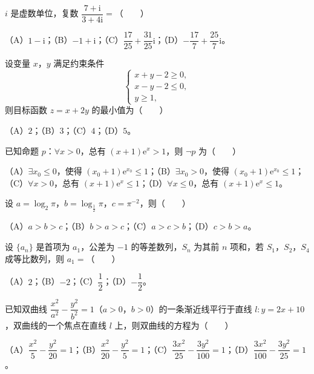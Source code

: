 \begin{question}
$i$ 是虚数单位，复数 $\dfrac{7+\mathrm i}{3+4\mathrm i}=$\mbox{（　　）}

（A）$1-\mathrm i$；（B）$-1+\mathrm i$；（C）$\dfrac{17}{25}+\dfrac{31}{25}\mathrm i$；（D）$-\dfrac{17}{7}+\dfrac{25}{7}\mathrm i$。

\end{question}
\begin{question}
设变量 $x$，$y$ 满足约束条件
\nopagebreak[4]
\[\begin{cases}
x+y-2\geqslant 0,\\
x-y-2\leqslant 0,\\
y\geqslant 1,
\end{cases}\]
则目标函数 $z=x+2y$ 的最小值为\mbox{（　　）}

（A）$2$；（B）$3$；（C）$4$；（D）$5$。

\end{question}
\begin{question}
已知命题 $p$：$\forall x>0$，总有 $(x+1)\mathrm e^x>1$，则 $\neg p$ 为\mbox{（　　）}

（A）$\exists x_0\leqslant 0$，使得 $(x_0+1)\mathrm e^{x_0}\leqslant 1$；（B）$\exists x_0>0$，使得 $(x_0+1)\mathrm e^{x_0}\leqslant 1$；（C）$\forall x>0$，总有 $(x+1)\mathrm e^x\leqslant 1$；（D）$\forall x\leqslant 0$，总有 $(x+1)\mathrm e^x\leqslant 1$。

\end{question}
\begin{question}
设 $a=\log_2\pi$，$b=\log_{\frac12}\pi$，$c=\pi^{-2}$，则\mbox{（　　）}

（A）$a>b>c$；（B）$b>a>c$；（C）$a>c>b$；（D）$c>b>a$。

\end{question}
\begin{question}
设 $\{a_n\}$ 是首项为 $a_1$，公差为 $-1$ 的等差数列，$S_n$ 为其前 $n$ 项和，若 $S_1$，$S_2$，$S_4$ 成等比数列，则 $a_1=$\mbox{（　　）}

（A）$2$；（B）$-2$；（C）$\dfrac12$；（D）$-\dfrac12$。

\end{question}
\begin{question}
已知双曲线 $\dfrac{x^2}{a^2}-\dfrac{y^2}{b^2}=1$（$a>0$，$b>0$）的一条渐近线平行于直线 $l:y=2x+10$，双曲线的一个焦点在直线 $l$ 上，则双曲线的方程为\mbox{（　　）}

（A）$\dfrac{x^2}{5}-\dfrac{y^2}{20}=1$；（B）$\dfrac{x^2}{20}-\dfrac{y^2}{5}=1$；（C）$\dfrac{3x^2}{25}-\dfrac{3y^2}{100}=1$；（D）$\dfrac{3x^2}{100}-\dfrac{3y^2}{25}=1$。

\Needspace{0.4\textheight}
\end{question}

